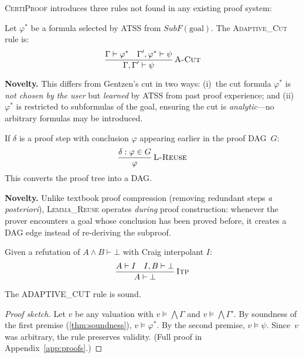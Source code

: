 \documentclass[acmtocl,review,anonymous]{acmart}
\newcommand{\entails}{\vDash}
\newcommand{\proves}{\vdash}
\newcommand{\dlbot}{\bot}
\newcommand{\CP}{\textsc{CertiProof}}
\newcommand{\ATSS}{\textsc{ATSS}}
\newcommand{\infrule}[3]{
  \dfrac{\displaystyle #2}{\displaystyle #3}\,\textsc{#1}
}
\begin{document}
\CP{} introduces three rules not found in any existing proof system:

\begin{definition}
  \label{def:adaptive-cut}
  Let $\varphi^*$ be a formula selected by \ATSS{} from
  $\mathit{SubF}(\text{goal})$.  The \textsc{Adaptive\_Cut} rule is:
  \begin{equation}
    \infrule{A-Cut}
      {\Gamma \proves \varphi^* \quad
       \Gamma', \varphi^* \proves \psi}
      {\Gamma, \Gamma' \proves \psi}
  \end{equation}
\end{definition}

\noindent\textbf{Novelty.}  This differs from Gentzen's cut in two
ways: (i)~the cut formula $\varphi^*$ is \emph{not chosen by the
user} but \emph{learned} by \ATSS{} from past proof experience; and
(ii)~$\varphi^*$ is restricted to subformulas of the goal, ensuring
the cut is \emph{analytic}---no arbitrary formulas may be introduced.

\begin{definition}
  If $\delta$ is a proof step with conclusion $\varphi$ appearing
  earlier in the proof DAG~$G$:
  \begin{equation}
    \infrule{L-Reuse}
      {\delta : \varphi \in G}
      {\varphi}
  \end{equation}
  This converts the proof tree into a DAG.
\end{definition}

\noindent\textbf{Novelty.}  Unlike textbook proof compression
(removing redundant steps \emph{a posteriori}), \textsc{Lemma\_Reuse}
operates \emph{during} proof construction: whenever the prover
encounters a goal whose conclusion has been proved before, it
creates a DAG edge instead of re-deriving the subproof.

\begin{definition}[INTERPOLANT]
  Given a refutation of $A \wedge B \proves \dlbot$ with Craig
  interpolant $I$:
  \begin{equation}
    \infrule{Itp}
      {A \proves I \quad I, B \proves \dlbot}
      {A \proves \dlbot}
  \end{equation}
\end{definition}

\begin{theorem}
  \label{thm:adaptive-cut-sound}
  The \textup{ADAPTIVE\_CUT} rule is sound.
\end{theorem}
\begin{proof}[Proof sketch]
  Let $v$ be any valuation with
  $v \entails \bigwedge\Gamma$ and $v \entails \bigwedge\Gamma'$.
  By soundness of the first premise (\cref{thm:soundness}),
  $v \entails \varphi^*$.  By the second premise,
  $v \entails \psi$.  Since~$v$ was arbitrary, the rule preserves
  validity.
  (Full proof in Appendix~\ref{app:proofs}.)
\end{proof}
\end{document}
